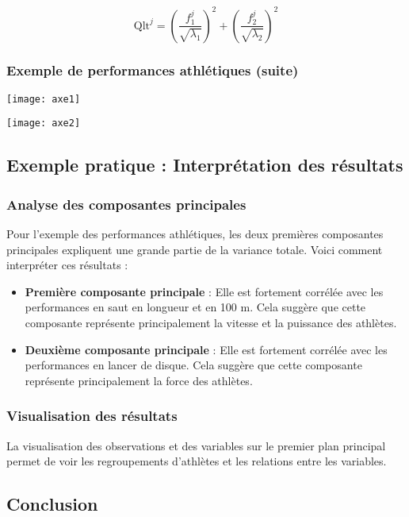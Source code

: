 \documentclass[10pt,a4paper]{article}
\begin{document}
\[
\text{Qlt}^j = \left( \frac{f_1^j}{\sqrt{\lambda_1}} \right)^2 + \left( \frac{f_2^j}{\sqrt{\lambda_2}} \right)^2
\]

\subsubsection*{Exemple de performances athlétiques (suite)}
\texttt{[image: axe1]}

\texttt{[image: axe2]}

\subsection*{Exemple pratique : Interprétation des résultats}
\subsubsection*{Analyse des composantes principales}
Pour l'exemple des performances athlétiques, les deux premières composantes principales expliquent une grande partie de la variance totale. Voici comment interpréter ces résultats :

\begin{itemize}
    \item \textbf{Première composante principale} : Elle est fortement corrélée avec les performances en saut en longueur et en 100 m. Cela suggère que cette composante représente principalement la vitesse et la puissance des athlètes.
    \item \textbf{Deuxième composante principale} : Elle est fortement corrélée avec les performances en lancer de disque. Cela suggère que cette composante représente principalement la force des athlètes.
\end{itemize}

\subsubsection*{Visualisation des résultats}
La visualisation des observations et des variables sur le premier plan principal permet de voir les regroupements d'athlètes et les relations entre les variables.


\subsection*{Conclusion}
\end{document}
